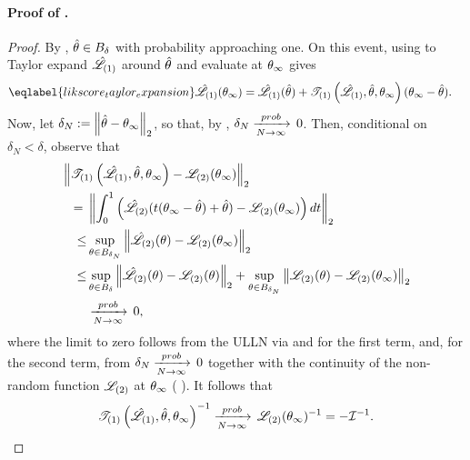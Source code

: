 \paragraph{Proof of .}
\begin{proof}
%

By , $\hat\theta \in B_{\delta}$ with
probability approaching one.  On this event,
using  to Taylor expand $\hat{\mathscr{L}}_{(1)}$ around
$\hat\theta$ and evaluate at $\theta_{\infty}$ gives
%
\begin{align}\eqlabel{likscore_taylor_expansion}
%
\likhatk{1}(\thetatrue) ={}&
    \likhatk{1}(\thetahat) +
    \tresid{1}{\likhatk{1}, \thetahat, \thetatrue} (\thetatrue - \thetahat).
\end{align}
%
Now, let $\delta_N := \left\Vert \hat\theta - \theta_{\infty}\right\Vert_2$,
so that, by , $\delta_N \xrightarrow[N\rightarrow\infty]{prob}\, 0$.
Then, conditional on $\delta_N < \delta$, observe that
%
\begin{align*}
%
\MoveEqLeft
\norm{\tresid{1}{\likhatk{1}, \thetahat, \thetatrue} - \likk{2}(\thetatrue)}_2
\\={}&
\norm{\int_0^1
\left(
    \likhatk{2}(t (\thetatrue - \thetahat) + \thetahat) - \likk{2}(\thetatrue)
\right) dt
}_2
\\ \le&
\sup_{\theta \in \thetaball{\delta_N}}
    \norm{\likhatk{2}(\theta) - \likk{2}(\thetatrue)}_2
\\ \le&
\sup_{\theta \in \thetaball{\delta}}
    \norm{\likhatk{2}(\theta) - \likk{2}(\theta)}_2 +
\sup_{\theta \in \thetaball{\delta_N}}
    \norm{\likk{2}(\theta) - \likk{2}(\thetatrue)}_2
\\ &\plim 0,
%
\end{align*}
%
where the limit to zero follows from the ULLN via 
 and  for the first term, and, for the second
term, from $\delta_N \xrightarrow[N\rightarrow\infty]{prob}\, 0$ together with the continuity of the non-random
function $\mathscr{L}_{(2)}$ at $\theta_{\infty}$ (
).
It follows that
%
\begin{align*}
%
\tresid{1}{\likhatk{1}, \thetahat, \thetatrue}^{-1} \plim
    \likk{2}(\thetatrue)^{-1} = -\info^{-1}.
%
\end{align*}


\end{proof}
